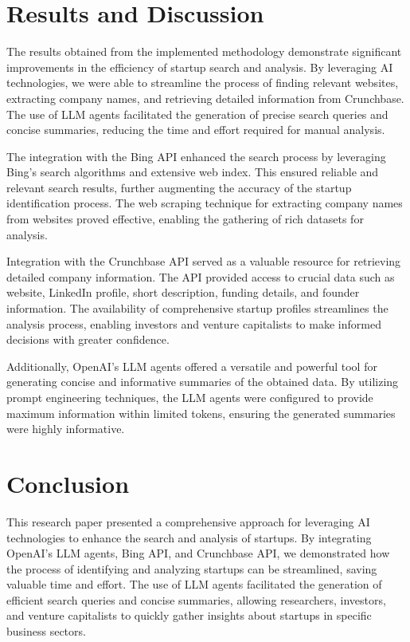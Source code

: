 \documentclass[a4paper,11pt]{article}
\begin{document}
\section{Results and Discussion}
The results obtained from the implemented methodology demonstrate significant improvements in the efficiency of startup search and analysis. By leveraging AI technologies, we were able to streamline the process of finding relevant websites, extracting company names, and retrieving detailed information from Crunchbase. The use of LLM agents facilitated the generation of precise search queries and concise summaries, reducing the time and effort required for manual analysis.

The integration with the Bing API enhanced the search process by leveraging Bing's search algorithms and extensive web index. This ensured reliable and relevant search results, further augmenting the accuracy of the startup identification process. The web scraping technique for extracting company names from websites proved effective, enabling the gathering of rich datasets for analysis.

Integration with the Crunchbase API served as a valuable resource for retrieving detailed company information. The API provided access to crucial data such as website, LinkedIn profile, short description, funding details, and founder information. The availability of comprehensive startup profiles streamlines the analysis process, enabling investors and venture capitalists to make informed decisions with greater confidence.

Additionally, OpenAI's LLM agents offered a versatile and powerful tool for generating concise and informative summaries of the obtained data. By utilizing prompt engineering techniques, the LLM agents were configured to provide maximum information within limited tokens, ensuring the generated summaries were highly informative.

\section{Conclusion}
This research paper presented a comprehensive approach for leveraging AI technologies to enhance the search and analysis of startups. By integrating OpenAI's LLM agents, Bing API, and Crunchbase API, we demonstrated how the process of identifying and analyzing startups can be streamlined, saving valuable time and effort. The use of LLM agents facilitated the generation of efficient search queries and concise summaries, allowing researchers, investors, and venture capitalists to quickly gather insights about startups in specific business sectors.
\end{document}
